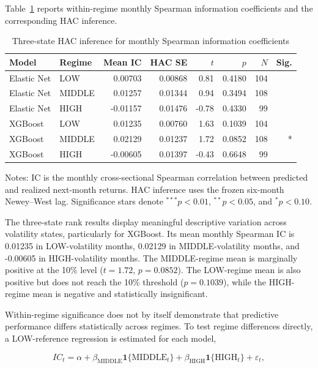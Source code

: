 Table~\ref{tab:rank-ic-three-state-inference} reports within-regime monthly Spearman information coefficients and the corresponding HAC inference.

\begin{table}[htbp]
\centering
\caption{Three-state HAC inference for monthly Spearman information coefficients}
\label{tab:rank-ic-three-state-inference}
\small
\begin{tabular}{llrrrrrr}
\hline
Model & Regime & Mean IC & HAC SE & $t$ & $p$ & $N$ & Sig. \\
\hline
Elastic Net & LOW    &  0.00703 & 0.00868 &  0.81 & 0.4180 & 104 &  \\
Elastic Net & MIDDLE &  0.01257 & 0.01344 &  0.94 & 0.3494 & 108 &  \\
Elastic Net & HIGH   & -0.01157 & 0.01476 & -0.78 & 0.4330 &  99 &  \\
XGBoost     & LOW    &  0.01235 & 0.00760 &  1.63 & 0.1039 & 104 &  \\
XGBoost     & MIDDLE &  0.02129 & 0.01237 &  1.72 & 0.0852 & 108 & * \\
XGBoost     & HIGH   & -0.00605 & 0.01397 & -0.43 & 0.6648 &  99 &  \\
\hline
\end{tabular}
\begin{flushleft}
\small
Notes: IC is the monthly cross-sectional Spearman correlation between predicted and realized next-month returns. HAC inference uses the frozen six-month Newey--West lag. Significance stars denote $^{***}p<0.01$, $^{**}p<0.05$, and $^{*}p<0.10$.
\end{flushleft}
\end{table}

The three-state rank results display meaningful descriptive variation across volatility states, particularly for XGBoost. Its mean monthly Spearman IC is 0.01235 in LOW-volatility months, 0.02129 in MIDDLE-volatility months, and -0.00605 in HIGH-volatility months. The MIDDLE-regime mean is marginally positive at the 10\% level ($t=1.72$, $p=0.0852$). The LOW-regime mean is also positive but does not reach the 10\% threshold ($p=0.1039$), while the HIGH-regime mean is negative and statistically insignificant.

Within-regime significance does not by itself demonstrate that predictive performance differs statistically across regimes. To test regime differences directly, a LOW-reference regression is estimated for each model,

\begin{equation}
IC_t
=
\alpha
+
\beta_{\mathrm{MIDDLE}}
\mathbf{1}\{\mathrm{MIDDLE}_t\}
+
\beta_{\mathrm{HIGH}}
\mathbf{1}\{\mathrm{HIGH}_t\}
+
\varepsilon_t,
\end{equation}

